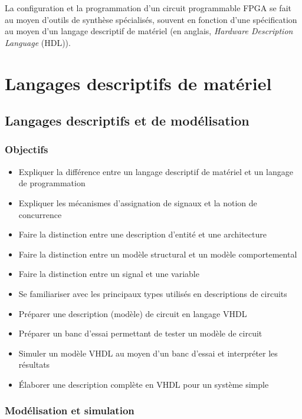 \documentclass[letter, oneside]{book}
\begin{document}
La configuration et la programmation d'un circuit programmable FPGA se
fait au moyen d'outils de synthèse spécialisés, souvent en fonction
d'une spécification au moyen d'un langage descriptif de matériel (en
anglais, \emph{Hardware Description Language} (HDL)).

\part{Langages descriptifs de matériel}
\label{sec:org5c7228c}
\chapter{Langages descriptifs et de modélisation}
\label{sec:org6844e9d}

\section{Objectifs}
\label{sec:orgaf468cc}
\begin{itemize}
\item Expliquer la différence entre un langage descriptif de matériel et
un langage de programmation
\item Expliquer les mécanismes d'assignation de signaux et la notion de concurrence
\item Faire la distinction entre une description d'entité et une architecture
\item Faire la distinction entre un modèle structural et un modèle
comportemental
\item Faire la distinction entre un signal et une variable
\item Se familiariser avec les principaux types utilisés en descriptions
de circuits
\item Préparer une description (modèle) de circuit en langage VHDL
\item Préparer un banc d'essai permettant de tester un modèle de circuit
\item Simuler un modèle VHDL au moyen d'un banc d'essai et interpréter les
résultats
\item Élaborer une description complète en VHDL pour un système simple
\end{itemize}


\section{Modélisation et simulation}
\label{sec:org8092c25}
\end{document}
